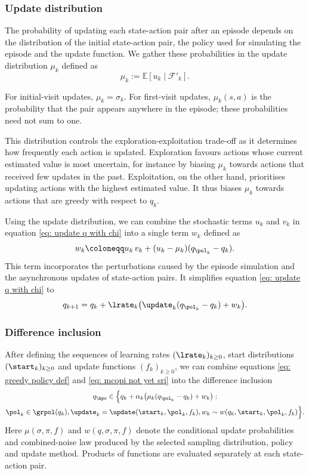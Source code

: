 \subsubsection{Update distribution}

The probability of updating each state-action pair after an episode depends on the distribution of the initial state-action pair, the policy used for simulating the episode and the update function.
We gather these probabilities in the update distribution $\mu_k$ defined as
\[
\mu_k := \mathbb E [ u_k \mid \mathcal F'_k] .
\]

For initial-visit updates, $\mu_k=\sigma_k$. For first-visit updates, $\mu_k(s,a)$ is the probability that the pair appears anywhere in the episode; these probabilities need not sum to one.

This distribution controls the exploration-exploitation trade-off
as it determines how frequently each action is updated.
Exploration favours actions whose current estimated value is most uncertain, for instance by biasing $\mu_k$ towards actions that received few updates in the past.
Exploitation, on the other hand, prioritises updating actions with the highest estimated value. It thus biases $\mu_k$ towards actions that are greedy with respect to $q_k$.

Using the update distribution,
we can combine the stochastic terms $u_k$ and $v_k$ in equation \eqref{eq: update q with chi} into a single term $w_k$ defined as
\begin{align}
\label{eq: definition combined noise}
    w_k
    \coloneqq
    u_k \, v_k + (u_k - \mu_k) ( q_{\pol_k} - q_k ) .
\end{align}
This term incorporates the perturbations caused by the episode simulation and the asynchronous updates of state-action pairs.
It simplifies equation \eqref{eq: update q with chi} to
\begin{align}
\label{eq: mcopi not yet sri}
    q_{k+1}
    =
    q_k + \lrate_k \big( \update_k ( q_{\pol_k} - q_k ) + w_k \big) .
\end{align}

\subsubsection{Difference inclusion}

After defining the sequences of learning rates $(\lrate_k)_{k \ge 0}$, start distributions $(\start_k)_{k \ge 0}$ and update functions $(f_k)_{k \ge 0}$,
we can combine equations \eqref{eq: greedy policy def} and \eqref{eq: mcopi not yet sri} into the difference inclusion
\begin{multline}
\label{eq: mcopi sa}
    q_\kpo
    \in
    \Big\{ q_k + \alpha_k \big( \mu_k(q_{\pol_k} - q_k) + w_k \big)
    :
    \\
    \pol_k \in \grpol(q_k),
    \update_k = \update(\start_k, \pol_k, f_k),
    w_k \sim w(q_k, \start_k, \pol_k, f_k)
    \Big\} .
\end{multline}
Here $\mu(\sigma,\pi,f)$ and $w(q,\sigma,\pi,f)$ denote the conditional update probabilities and combined-noise law produced by the selected sampling distribution, policy and update method. Products of functions are evaluated separately at each state-action pair.

